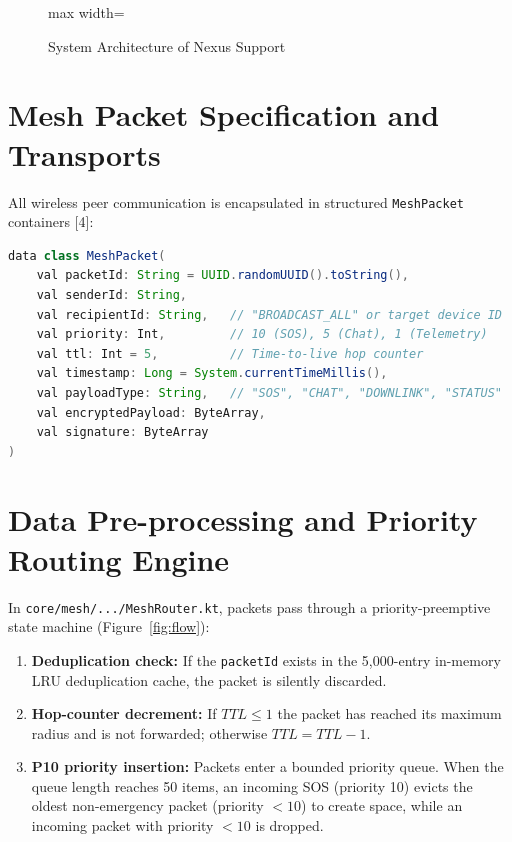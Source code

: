 \documentclass[12pt,a4paper]{report}
\begin{document}
\begin{figure}[htbp]
\begin{adjustbox}{max width=\linewidth}
\end{adjustbox}
\caption{System Architecture of Nexus Support}
\label{fig:sys_arch}
\end{figure}

\section{Mesh Packet Specification and Transports}
All wireless peer communication is encapsulated in structured \texttt{MeshPacket} containers [4]:
\begin{lstlisting}[language=Java,caption={MeshPacket Data Class}]
data class MeshPacket(
    val packetId: String = UUID.randomUUID().toString(),
    val senderId: String,
    val recipientId: String,   // "BROADCAST_ALL" or target device ID
    val priority: Int,         // 10 (SOS), 5 (Chat), 1 (Telemetry)
    val ttl: Int = 5,          // Time-to-live hop counter
    val timestamp: Long = System.currentTimeMillis(),
    val payloadType: String,   // "SOS", "CHAT", "DOWNLINK", "STATUS"
    val encryptedPayload: ByteArray,
    val signature: ByteArray
)
\end{lstlisting}

\section{Data Pre-processing and Priority Routing Engine}
In \texttt{core/mesh/.../MeshRouter.kt}, packets pass through a priority-preemptive state machine (Figure~\ref{fig:flow}):
\begin{enumerate}
    \item \textbf{Deduplication check:} If the \texttt{packetId} exists in the 5,000-entry in-memory LRU deduplication cache, the packet is silently discarded.
    \item \textbf{Hop-counter decrement:} If $TTL \le 1$ the packet has reached its maximum radius and is not forwarded; otherwise $TTL = TTL - 1$.
    \item \textbf{P10 priority insertion:} Packets enter a bounded priority queue. When the queue length reaches 50 items, an incoming SOS (priority 10) evicts the oldest non-emergency packet (priority $< 10$) to create space, while an incoming packet with priority $< 10$ is dropped.
\end{enumerate}
\end{document}
